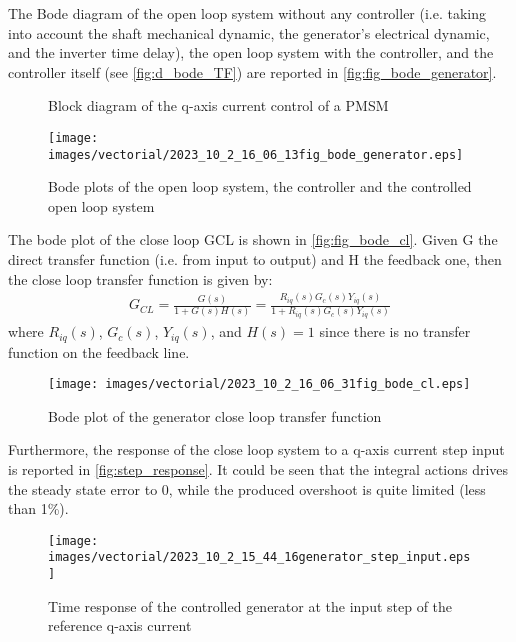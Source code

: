  The Bode diagram of the open loop system without any controller (i.e. taking into account the shaft mechanical dynamic, the generator's electrical dynamic, and the inverter time delay), the open loop system with the controller, and the controller itself (see \autoref{fig:d_bode_TF}) are reported in \autoref{fig:fig_bode_generator}.
  \begin{figure}[H]
    
    \caption{Block diagram of the q-axis current control of a PMSM}
    \label{fig:d_bode_TF}
  \end{figure}
  \begin{figure}[H]
    \centering
    \texttt{[image: images/vectorial/2023\_10\_2\_16\_06\_13fig\_bode\_generator.eps]}
    \caption{Bode plots of the open loop system, the controller and the controlled open loop system}
    \label{fig:fig_bode_generator}
   \end{figure}
  
 The bode plot of the close loop \acrshort{GCL} is shown in \autoref{fig:fig_bode_cl}. Given \acrshort{G} the direct transfer function (i.e. from input to output) and \acrshort{H} the feedback one, then the close loop transfer function is given by:
 \begin{gather}
     G_{CL}=\frac{G(s)}{1+G(s)H(s)}=\frac{R_{iq}(s)G_c(s)Y_{iq}(s)}{1+R_{iq}(s)G_c(s)Y_{iq}(s)}
     \label{eq:close_loop_TF}
 \end{gather}
 where $R_{iq}(s)$, $G_c(s)$, $Y_{iq}(s)$, and $H(s)=1$ since there is no transfer function on the feedback line.
 

 \begin{figure}[H]
    \centering
    \texttt{[image: images/vectorial/2023\_10\_2\_16\_06\_31fig\_bode\_cl.eps]}
    \caption{Bode plot of the generator close loop transfer function}
    \label{fig:fig_bode_cl}
 \end{figure}

Furthermore, the response of the close loop system to a q-axis current step input is reported in \autoref{fig:step_response}. It could be seen that the integral actions drives the steady state error to 0, while the produced overshoot is quite limited (less than 1\%). 

\begin{figure}[H]
  \centering
  \texttt{[image: images/vectorial/2023\_10\_2\_15\_44\_16generator\_step\_input.eps]}
  \caption{Time response of the controlled generator at the input step of the reference q-axis current}
  \label{fig:step_response}
\end{figure}

